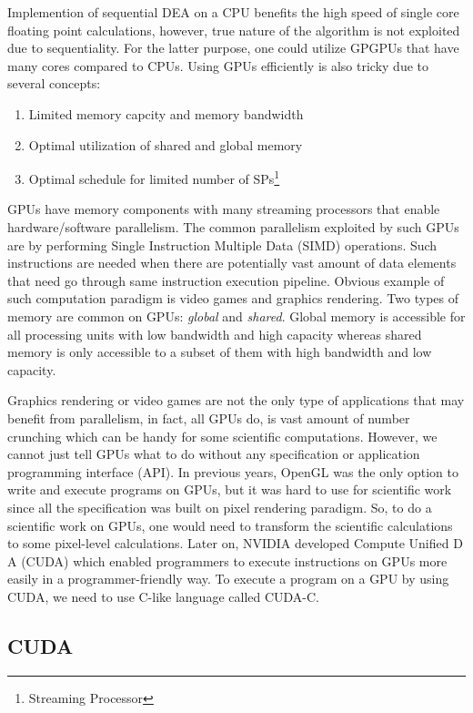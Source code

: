 \documentclass[conference]{IEEEtran}
\begin{document}
Implemention of sequential DEA on a CPU benefits the high speed of single core floating point calculations, however, true nature of the algorithm is not exploited due to sequentiality. For the latter 
purpose, one could utilize GPGPUs that have many cores compared to CPUs. Using GPUs efficiently is also tricky due to several concepts:

\begin{enumerate}
	\item Limited memory capcity and memory bandwidth
	\item Optimal utilization of shared and global memory
	\item Optimal schedule for limited number of SPs\footnote{Streaming Processor}
\end{enumerate}

GPUs have memory components with many streaming processors that enable hardware/software parallelism. The common parallelism exploited by such GPUs are by performing Single Instruction Multiple Data (SIMD) 
operations. Such instructions are needed when there are potentially vast amount of data elements that need go through same instruction execution pipeline. Obvious example of such computation paradigm is 
video games and graphics rendering. Two types of memory are common on GPUs: \textit{global} and \textit{shared}. Global memory is accessible for all processing units with low bandwidth and high capacity 
whereas shared memory is only accessible to a subset of them with high bandwidth and low capacity.

Graphics rendering or video games are not the only type of applications that may benefit from parallelism, in fact, all GPUs do, is vast amount of number crunching which can be handy for some scientific 
computations. However, we cannot just tell GPUs what to do without any specification or application programming interface (API). In previous years, OpenGL was the only option to write and execute 
programs on GPUs, but it was hard to use for scientific work since all the specification was built on pixel rendering paradigm. So, to do a scientific work on GPUs, one would need to transform the 
scientific calculations to some pixel-level calculations. Later on, NVIDIA developed Compute Unified D A (CUDA) which enabled programmers to execute instructions on GPUs more easily in a programmer-friendly 
way. To execute a program on a GPU by using CUDA, we need to use C-like language called CUDA-C.

\subsection{CUDA}
\end{document}
